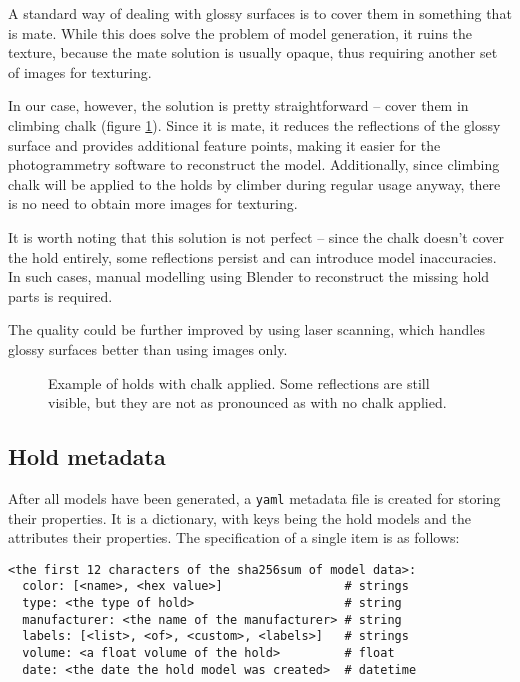 A standard way of dealing with glossy surfaces is to cover them in something that is mate.
While this does solve the problem of model generation, it ruins the texture, because the mate solution is usually opaque, thus requiring another set of images for texturing.

In our case, however, the solution is pretty straightforward -- cover them in climbing chalk (figure \ref{fig:chalk}).
Since it is mate, it reduces the reflections of the glossy surface and provides additional feature points, making it easier for the photogrammetry software to reconstruct the model.
Additionally, since climbing chalk will be applied to the holds by climber during regular usage anyway, there is no need to obtain more images for texturing.

It is worth noting that this solution is not perfect -- since the chalk doesn't cover the hold entirely, some reflections persist and can introduce model inaccuracies.
In such cases, manual modelling using Blender to reconstruct the missing hold parts is required.

The quality could be further improved by using laser scanning, which handles glossy surfaces better than using images only.

\begin{figure}[t]
	\centering
	\hfill
	\hfill
	\caption{Example of holds with chalk applied. Some reflections are still visible, but they are not as pronounced as with no chalk applied.}%
	\label{fig:chalk}
\end{figure}

\subsection{Hold metadata}
After all models have been generated, a \verb|yaml| metadata file is created for storing their properties.
It is a dictionary, with keys being the hold models and the attributes their properties.
The specification of a single item is as follows:

\begin{verbatim}
<the first 12 characters of the sha256sum of model data>:
  color: [<name>, <hex value>]                 # strings
  type: <the type of hold>                     # string
  manufacturer: <the name of the manufacturer> # string
  labels: [<list>, <of>, <custom>, <labels>]   # strings
  volume: <a float volume of the hold>         # float
  date: <the date the hold model was created>  # datetime
\end{verbatim}

